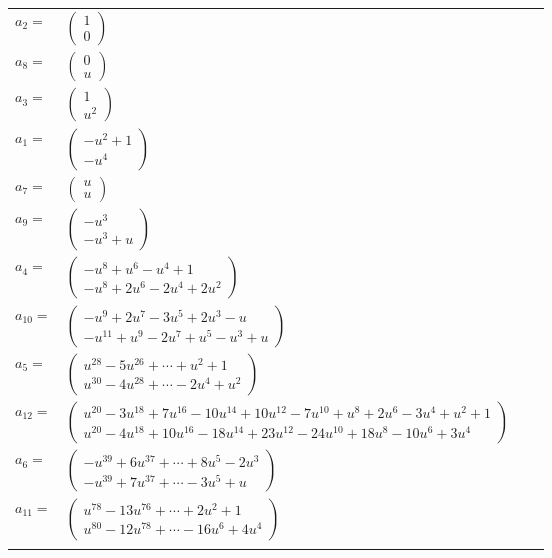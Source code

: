 \documentclass[1p]{elsarticle_modified}
\theoremstyle{definition}
\begin{document}
\begin{tabular}{m{7pt} m{180pt} m{7pt} m{180pt} }
\flushright $a_{2}=$&$\begin{pmatrix}1\\0\end{pmatrix}$ \\
\flushright $a_{8}=$&$\begin{pmatrix}0\\u\end{pmatrix}$ \\
\flushright $a_{3}=$&$\begin{pmatrix}1\\u^2\end{pmatrix}$ \\
\flushright $a_{1}=$&$\begin{pmatrix}- u^2+1\\- u^4\end{pmatrix}$ \\
\flushright $a_{7}=$&$\begin{pmatrix}u\\u\end{pmatrix}$ \\
\flushright $a_{9}=$&$\begin{pmatrix}- u^3\\- u^3+u\end{pmatrix}$ \\
\flushright $a_{4}=$&$\begin{pmatrix}- u^8+u^6- u^4+1\\- u^8+2 u^6-2 u^4+2 u^2\end{pmatrix}$ \\
\flushright $a_{10}=$&$\begin{pmatrix}- u^9+2 u^7-3 u^5+2 u^3- u\\- u^{11}+u^9-2 u^7+u^5- u^3+u\end{pmatrix}$ \\
\flushright $a_{5}=$&$\begin{pmatrix}u^{28}-5 u^{26}+\cdots+u^2+1\\u^{30}-4 u^{28}+\cdots-2 u^4+u^2\end{pmatrix}$ \\
\flushright $a_{12}=$&$\begin{pmatrix}u^{20}-3 u^{18}+7 u^{16}-10 u^{14}+10 u^{12}-7 u^{10}+u^8+2 u^6-3 u^4+u^2+1\\u^{20}-4 u^{18}+10 u^{16}-18 u^{14}+23 u^{12}-24 u^{10}+18 u^8-10 u^6+3 u^4\end{pmatrix}$ \\
\flushright $a_{6}=$&$\begin{pmatrix}- u^{39}+6 u^{37}+\cdots+8 u^5-2 u^3\\- u^{39}+7 u^{37}+\cdots-3 u^5+u\end{pmatrix}$ \\
\flushright $a_{11}=$&$\begin{pmatrix}u^{78}-13 u^{76}+\cdots+2 u^2+1\\u^{80}-12 u^{78}+\cdots-16 u^6+4 u^4\end{pmatrix}$\\&\end{tabular}
\end{document}

